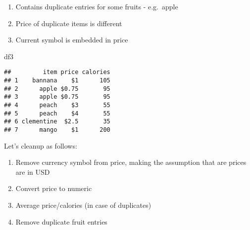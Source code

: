 \documentclass[
]{article}
\newenvironment{Shaded}{\begin{snugshade}}{\end{snugshade}}
\newcommand{\AttributeTok}[1]{\textcolor[rgb]{0.77,0.63,0.00}{#1}}
\newcommand{\CommentTok}[1]{\textcolor[rgb]{0.56,0.35,0.01}{\textit{#1}}}
\newcommand{\FunctionTok}[1]{\textcolor[rgb]{0.00,0.00,0.00}{#1}}
\newcommand{\NormalTok}[1]{#1}
\newcommand{\OtherTok}[1]{\textcolor[rgb]{0.56,0.35,0.01}{#1}}
\newcommand{\SpecialCharTok}[1]{\textcolor[rgb]{0.00,0.00,0.00}{#1}}
\newcommand{\StringTok}[1]{\textcolor[rgb]{0.31,0.60,0.02}{#1}}
\providecommand{\tightlist}{%
  \setlength{\itemsep}{0pt}\setlength{\parskip}{0pt}}
\begin{document}
\begin{enumerate}
\def\labelenumi{\arabic{enumi}.}
\tightlist
\item
  Contains duplicate entries for some fruits - e.g.~apple
\item
  Price of duplicate items is different
\item
  Current symbol is embedded in price
\end{enumerate}

\begin{Shaded}
\begin{Highlighting}[]
\NormalTok{df3}
\end{Highlighting}
\end{Shaded}

\begin{verbatim}
##         item price calories
## 1    bannana    $1      105
## 2      apple $0.75       95
## 3      apple $0.75       95
## 4      peach    $3       55
## 5      peach    $4       55
## 6 clementine  $2.5       35
## 7      mango    $1      200
\end{verbatim}

Let's cleanup as follows:

\begin{enumerate}
\def\labelenumi{\arabic{enumi}.}
\tightlist
\item
  Remove currency symbol from price, making the assumption that are
  prices are in USD
\item
  Convert price to numeric
\item
  Average price/calories (in case of duplicates)
\item
  Remove duplicate fruit entries
\end{enumerate}

\begin{Shaded}
\end{Shaded}
\end{document}
